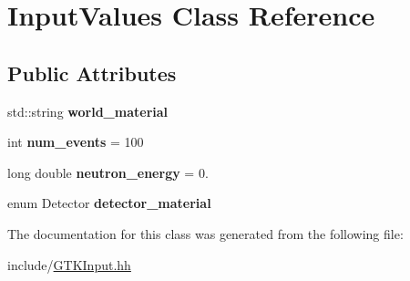 \hypertarget{classInputValues}{}\section{Input\+Values Class Reference}
\label{classInputValues}
\subsection*{Public Attributes}
\begin{DoxyCompactItemize}
\item 
\mbox{\label{classInputValues_a1054439a15815d3fe7161cae77bca497}} 
std\+::string {\bfseries world\+\_\+material}
\item 
\mbox{\label{classInputValues_a629e3a93c73d05dd50d5ec55845a0c35}} 
int {\bfseries num\+\_\+events} = 100
\item 
\mbox{\label{classInputValues_abc160a2cae57302dacc29ea8b3f748c6}} 
long double {\bfseries neutron\+\_\+energy} = 0.
\item 
\mbox{\label{classInputValues_afb1006c81c63900dce636b8252a8ea73}} 
enum Detector {\bfseries detector\+\_\+material}
\end{DoxyCompactItemize}


The documentation for this class was generated from the following file\+:\begin{DoxyCompactItemize}
\item 
include/\hyperlink{GTKInput_8hh}{G\+T\+K\+Input.\+hh}\end{DoxyCompactItemize}
